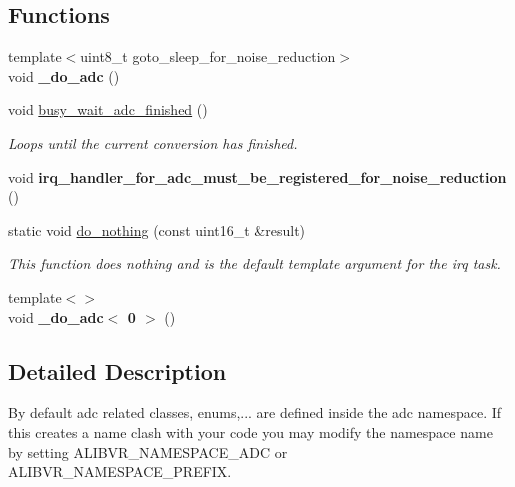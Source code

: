 \subsection*{Functions}
\begin{DoxyCompactItemize}
\item 
{\footnotesize template$<$uint8\+\_\+t goto\+\_\+sleep\+\_\+for\+\_\+noise\+\_\+reduction$>$ }\\void {\bfseries \+\_\+do\+\_\+adc} ()\hypertarget{namespaceadc_ab569dff590b3bb745fb012aa29ec5723}{}\label{namespaceadc_ab569dff590b3bb745fb012aa29ec5723}

\item 
void \hyperlink{namespaceadc_a4228912d1c32eafc1987a8adb80f4984}{busy\+\_\+wait\+\_\+adc\+\_\+finished} ()\hypertarget{namespaceadc_a4228912d1c32eafc1987a8adb80f4984}{}\label{namespaceadc_a4228912d1c32eafc1987a8adb80f4984}

\begin{DoxyCompactList}\small\item\em Loops until the current conversion has finished. \end{DoxyCompactList}\item 
void {\bfseries irq\+\_\+handler\+\_\+for\+\_\+adc\+\_\+must\+\_\+be\+\_\+registered\+\_\+for\+\_\+noise\+\_\+reduction} ()\hypertarget{namespaceadc_a0f2e8fa37ba3e91fc9e7a58e3543eaaa}{}\label{namespaceadc_a0f2e8fa37ba3e91fc9e7a58e3543eaaa}

\item 
static void \hyperlink{namespaceadc_a4d20cd58db88b2e3099aa5689e33235d}{do\+\_\+nothing} (const uint16\+\_\+t \&result)
\begin{DoxyCompactList}\small\item\em This function does nothing and is the default template argument for the irq task. \end{DoxyCompactList}\item 
{\footnotesize template$<$$>$ }\\void {\bfseries \+\_\+do\+\_\+adc$<$ 0 $>$} ()\hypertarget{namespaceadc_a6e0b185b550424440d92bc2b129f6128}{}\label{namespaceadc_a6e0b185b550424440d92bc2b129f6128}

\end{DoxyCompactItemize}


\subsection{Detailed Description}
By default adc related classes, enums,... are defined inside the {\ttfamily adc} namespace. If this creates a name clash with your code you may modify the namespace name by setting A\+L\+I\+B\+V\+R\+\_\+\+N\+A\+M\+E\+S\+P\+A\+C\+E\+\_\+\+A\+DC or A\+L\+I\+B\+V\+R\+\_\+\+N\+A\+M\+E\+S\+P\+A\+C\+E\+\_\+\+P\+R\+E\+F\+IX. 

